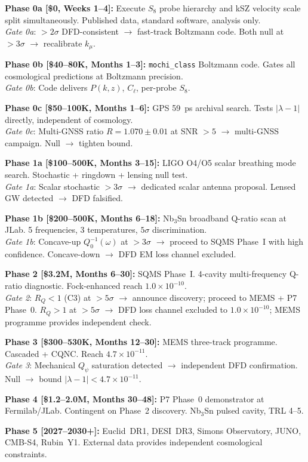 \documentclass[11pt]{article}
\newcommand{\ee}[1]{\times 10^{#1}}
\newcommand{\lbone}{|\lambda - 1|}
\newcommand{\Qpsi}{Q_\psi}
\begin{document}
\begin{tcolorbox}[colback=yellow!5!white, colframe=yellow!60!black,
  breakable,
  title=\textbf{OPTIMAL DECISION CASCADE --- W4i16 DEFINITIVE}]

\textbf{Phase 0a [\$0, Weeks 1--4]:}
Execute $S_8$ probe hierarchy and kSZ velocity scale split
simultaneously. Published data, standard software, analysis only.\\
\textit{Gate 0a}: $> 2\sigma$ DFD-consistent $\to$ fast-track
Boltzmann code. Both null at $> 3\sigma$ $\to$ recalibrate $k_\mu$.

\bigskip
\textbf{Phase 0b [\$40--80K, Months 1--3]:}
\texttt{mochi\_class} Boltzmann code. Gates all cosmological
predictions at Boltzmann precision.\\
\textit{Gate 0b}: Code delivers $P(k,z)$, $C_\ell$, per-probe $S_8$.

\bigskip
\textbf{Phase 0c [\$50--100K, Months 1--6]:}
GPS 59~ps archival search. Tests $\lbone$ directly, independent
of cosmology.\\
\textit{Gate 0c}: Multi-GNSS ratio $R = 1.070 \pm 0.01$ at
SNR $> 5$ $\to$ multi-GNSS campaign. Null $\to$ tighten bound.

\bigskip
\textbf{Phase 1a [\$100--500K, Months 3--15]:}
LIGO O4/O5 scalar breathing mode search. Stochastic + ringdown +
lensing null test.\\
\textit{Gate 1a}: Scalar stochastic $> 3\sigma$ $\to$ dedicated
scalar antenna proposal. Lensed GW detected $\to$ DFD falsified.

\bigskip
\textbf{Phase 1b [\$200--500K, Months 6--18]:}
Nb$_3$Sn broadband Q-ratio scan at JLab. 5 frequencies, 3
temperatures, $5\sigma$ discrimination.\\
\textit{Gate 1b}: Concave-up $Q_0^{-1}(\omega)$ at $> 3\sigma$
$\to$ proceed to SQMS Phase~I with high confidence. Concave-down
$\to$ DFD EM loss channel excluded.

\bigskip
\textbf{Phase 2 [\$3.2M, Months 6--30]:}
SQMS Phase~I. 4-cavity multi-frequency Q-ratio diagnostic.
Fock-enhanced reach $1.0\ee{-10}$.\\
\textit{Gate 2}: $R_Q < 1$ (C3) at $> 5\sigma$ $\to$ announce
discovery; proceed to MEMS + P7 Phase~0. $R_Q > 1$ at $> 5\sigma$
$\to$ DFD loss channel excluded to $1.0\ee{-10}$; MEMS programme
provides independent check.

\bigskip
\textbf{Phase 3 [\$300--530K, Months 12--30]:}
MEMS three-track programme. Cascaded + CQNC. Reach $4.7\ee{-11}$.\\
\textit{Gate 3}: Mechanical $\Qpsi$ saturation detected $\to$
independent DFD confirmation. Null $\to$ bound $\lbone < 4.7\ee{-11}$.

\bigskip
\textbf{Phase 4 [\$1.2--2.0M, Months 30--48]:}
P7 Phase~0 demonstrator at Fermilab/JLab. Contingent on Phase~2
discovery. Nb$_3$Sn pulsed cavity, TRL 4--5.

\bigskip
\textbf{Phase 5 [2027--2030+]:}
Euclid~DR1, DESI~DR3, Simons Observatory, JUNO, CMB-S4, Rubin~Y1.
External data provides independent cosmological constraints.

\end{tcolorbox}
\end{document}

